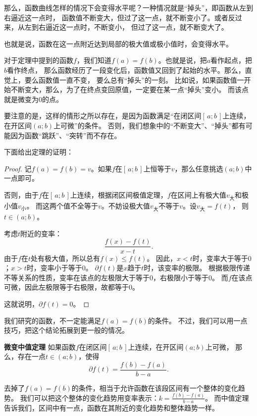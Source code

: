 \documentclass[12pt,UTF8,fontset=none]{ctexbook}
\begin{document}
那么，函数曲线怎样的情况下会变得水平呢？一种情况就是“掉头”，即函数从左到右逼近这一点时，
函数值不断变大，但过了这一点，就不断变小了。或者反过来，从左到右逼近这一点时，不断变小，
但过了这一点，就不断变大了。

也就是说，函数在这一点附近达到局部的极大值或极小值时，会变得水平。

对于定理中提到的函数$f$，我们知道$f(a) = f(b)$。也就是说，把$a$看作起点，把$b$看作终点，
那么函数经历了一段变化后，函数值又回到了起始的水平。那么，直觉上，要么函数值一直不变，
要么总有“掉头”的一刻。
比如说，如果函数值一开始不断变大，那么，为了在终点变回原值，一定要在某一点“掉头”变小。
而该点就是微变为$0$的点。

要注意的是，这样的情形之所以存在，是因为函数满足“在闭区间$[\,a; b\,]$上连续，在开区间$(a; b)$上可微”的条件。
否则，我们想象中的“不断变大”、“掉头”都有可能因为函数“跳跃”、“突转”而不存在。

下面给出定理的证明：
\begin{proof}
    记$f(a) = f(b) = v$。如果$f$在$[\,a; b\,]$上恒等于$v$，那么任意挑选$(a; b)$中一点即可。

    否则，由于$f$在$[\,a; b\,]$上连续，根据闭区间极值定理，$f$在区间上有极大值$v_{\text{大}}$和极小值$v_{\text{小}}$。
    而这两个值不全等于$v$。不妨设极大值$v_{\text{大}}$不等于$v$。设$v_{\text{大}} = f(t)$，
    则$t\in(a; b)$。

    考虑$t$附近的变率：
    $$ \frac{f(x) - f(t)}{x - t}. $$
    由于$f$在$t$处有极大值，所以总有$f(x) \leqslant f(t)$。
    因此，$x<t$时，变率大于等于$0$；$x>t$时，变率小于等于$0$。
    $\partial f(t)$是$x$趋于$t$时，该变率的极限。
    根据极限传递不等关系的性质，变率在该点的左极限大于等于$0$，右极限小于等于$0$。
    而$f$在该点可微，因此左极限等于右极限，故都等于$0$。
    
    这就说明，$ \partial f(t) = 0$。
\end{proof}

我们研究的函数，不一定能满足$f(a) = f(b)$的条件。
不过，我们可以用一点技巧，把这个结论拓展到更一般的情况。

\begin{tm}{\textbf{微变中值定理}}\label{tm:2-4-10}
    如果函数$f$在闭区间$[\,a; b\,]$上连续，在开区间$(a; b)$上可微，
    那么，存在一点$t\in(a; b)$，使得
    $$ \partial f(t) = \frac{f(b) - f(a)}{b - a}.$$
\end{tm}

去掉了$f(a) = f(b)$的条件，相当于允许函数在该段区间有一个整体的变化趋势。
我们可以把这个整体的变化趋势用变率表示：$k = \frac{f(b) - f(a)}{b - a}$。
而中值定理告诉我们，区间中有一点，函数在其附近的变化趋势和整体趋势一样。
\end{document}

